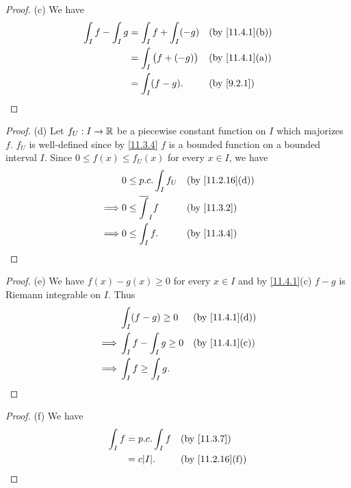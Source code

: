 \begin{proof}{(c)}
  We have
  \begin{align*}
    \int_I f - \int_I g & = \int_I f + \int_I (-g)    &  & \text{(by \cref{11.4.1}(b))} \\
                        & = \int_I \big(f + (-g)\big) &  & \text{(by \cref{11.4.1}(a))} \\
                        & = \int_I (f - g).           &  & \by{9.2.1}
  \end{align*}
\end{proof}

\begin{proof}{(d)}
  Let \(f_U : I \to \mathbb{R}\) be a piecewise constant function on \(I\) which majorizes \(f\).
  \(f_U\) is well-defined since by \cref{11.3.4} \(f\) is a bounded function on a bounded interval \(I\).
  Since \(0 \leq f(x) \leq f_U(x)\) for every \(x \in I\), we have
  \begin{align*}
             & 0 \leq p.c. \int_I f_U     &  & \text{(by \cref{11.2.16}(d))} \\
    \implies & 0 \leq \overline{\int}_I f &  & \text{(by \cref{11.3.2})}     \\
    \implies & 0 \leq \int_I f.           &  & \text{(by \cref{11.3.4})}
  \end{align*}
\end{proof}

\begin{proof}{(e)}
  We have \(f(x) - g(x) \geq 0\) for every \(x \in I\) and by \cref{11.4.1}(c) \(f - g\) is Riemann integrable on \(I\).
  Thus
  \begin{align*}
             & \int_I (f - g) \geq 0      &  & \text{(by \cref{11.4.1}(d))} \\
    \implies & \int_I f - \int_I g \geq 0 &  & \text{(by \cref{11.4.1}(c))} \\
    \implies & \int_I f \geq \int_I g.
  \end{align*}
\end{proof}

\begin{proof}{(f)}
  We have
  \begin{align*}
    \int_I f & = p.c. \int_I f &  & \text{(by \cref{11.3.7})}     \\
             & = c \abs{I}.    &  & \text{(by \cref{11.2.16}(f))}
  \end{align*}
\end{proof}

